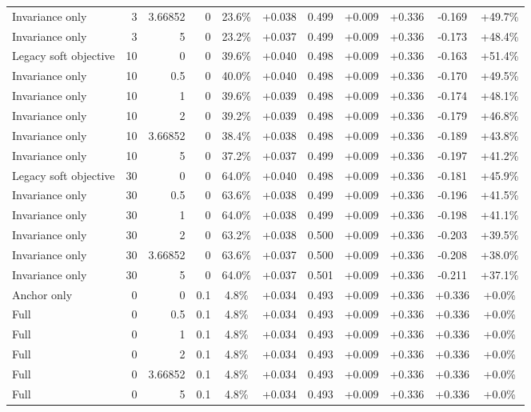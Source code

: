 \begin{table}[htbp]
\begin{tabular}{lrrrccccccc}
Invariance only & 3 & 3.66852 & 0 & 23.6\% & +0.038 & 0.499 & +0.009 & +0.336 & -0.169 & +49.7\% \\
Invariance only & 3 & 5 & 0 & 23.2\% & +0.037 & 0.499 & +0.009 & +0.336 & -0.173 & +48.4\% \\
Legacy soft objective & 10 & 0 & 0 & 39.6\% & +0.040 & 0.498 & +0.009 & +0.336 & -0.163 & +51.4\% \\
Invariance only & 10 & 0.5 & 0 & 40.0\% & +0.040 & 0.498 & +0.009 & +0.336 & -0.170 & +49.5\% \\
Invariance only & 10 & 1 & 0 & 39.6\% & +0.039 & 0.498 & +0.009 & +0.336 & -0.174 & +48.1\% \\
Invariance only & 10 & 2 & 0 & 39.2\% & +0.039 & 0.498 & +0.009 & +0.336 & -0.179 & +46.8\% \\
Invariance only & 10 & 3.66852 & 0 & 38.4\% & +0.038 & 0.498 & +0.009 & +0.336 & -0.189 & +43.8\% \\
Invariance only & 10 & 5 & 0 & 37.2\% & +0.037 & 0.499 & +0.009 & +0.336 & -0.197 & +41.2\% \\
Legacy soft objective & 30 & 0 & 0 & 64.0\% & +0.040 & 0.498 & +0.009 & +0.336 & -0.181 & +45.9\% \\
Invariance only & 30 & 0.5 & 0 & 63.6\% & +0.038 & 0.499 & +0.009 & +0.336 & -0.196 & +41.5\% \\
Invariance only & 30 & 1 & 0 & 64.0\% & +0.038 & 0.499 & +0.009 & +0.336 & -0.198 & +41.1\% \\
Invariance only & 30 & 2 & 0 & 63.2\% & +0.038 & 0.500 & +0.009 & +0.336 & -0.203 & +39.5\% \\
Invariance only & 30 & 3.66852 & 0 & 63.6\% & +0.037 & 0.500 & +0.009 & +0.336 & -0.208 & +38.0\% \\
Invariance only & 30 & 5 & 0 & 64.0\% & +0.037 & 0.501 & +0.009 & +0.336 & -0.211 & +37.1\% \\
Anchor only & 0 & 0 & 0.1 & 4.8\% & +0.034 & 0.493 & +0.009 & +0.336 & +0.336 & +0.0\% \\
Full & 0 & 0.5 & 0.1 & 4.8\% & +0.034 & 0.493 & +0.009 & +0.336 & +0.336 & +0.0\% \\
Full & 0 & 1 & 0.1 & 4.8\% & +0.034 & 0.493 & +0.009 & +0.336 & +0.336 & +0.0\% \\
Full & 0 & 2 & 0.1 & 4.8\% & +0.034 & 0.493 & +0.009 & +0.336 & +0.336 & +0.0\% \\
Full & 0 & 3.66852 & 0.1 & 4.8\% & +0.034 & 0.493 & +0.009 & +0.336 & +0.336 & +0.0\% \\
Full & 0 & 5 & 0.1 & 4.8\% & +0.034 & 0.493 & +0.009 & +0.336 & +0.336 & +0.0\% \\

\end{tabular}
\end{table}
